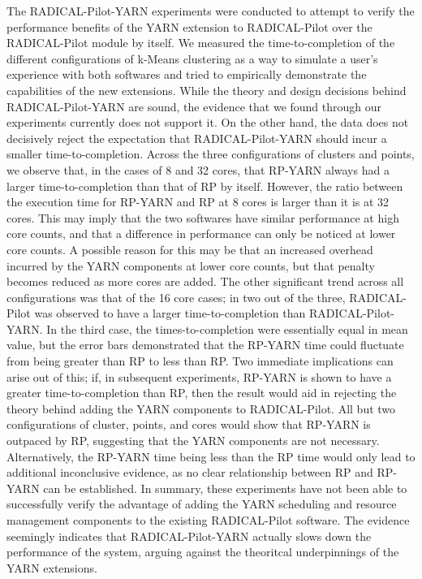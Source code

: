 \documentclass[]{article}
\begin{document}
    The RADICAL-Pilot-YARN experiments were conducted to attempt to verify the performance benefits of the YARN extension to RADICAL-Pilot over the RADICAL-Pilot module by itself. We measured the time-to-completion of the different configurations of k-Means clustering as a way to simulate a user's experience with both softwares and tried to empirically demonstrate the capabilities of the new extensions. While the theory and design decisions behind RADICAL-Pilot-YARN are sound, the evidence that we found through our experiments currently does not support it. On the other hand, the data does not decisively reject the expectation that RADICAL-Pilot-YARN should incur a smaller time-to-completion. Across the three configurations of clusters and points, we observe that, in the cases of 8 and 32 cores, that RP-YARN always had a larger time-to-completion than that of RP by itself. However, the ratio between the execution time for RP-YARN and RP at 8 cores is larger than it is at 32 cores. This may imply that the two softwares have similar performance at high core counts, and that a difference in performance can only be noticed at lower core counts. A possible reason for this may be that an increased overhead incurred by the YARN components at lower core counts, but that penalty becomes reduced as more cores are added. The other significant trend across all configurations was that of the 16 core cases; in two out of the three, RADICAL-Pilot was observed to have a larger time-to-completion than RADICAL-Pilot-YARN. In the third case, the times-to-completion were essentially equal in mean value, but the error bars demonstrated that the RP-YARN time could fluctuate from being greater than RP to less than RP. Two immediate implications can arise out of this; if, in subsequent experiments, RP-YARN is shown to have a greater time-to-completion than RP, then the result would aid in rejecting the theory behind adding the YARN components to RADICAL-Pilot. All but two configurations of cluster, points, and cores would show that RP-YARN is outpaced by RP, suggesting that the YARN components are not necessary. Alternatively, the RP-YARN time being less than the RP time would only lead to additional inconclusive evidence, as no clear relationship between RP and RP-YARN can be established. In summary, these experiments have not been able to successfully verify the advantage of adding the YARN scheduling and resource management components to the existing RADICAL-Pilot software. The evidence seemingly indicates that RADICAL-Pilot-YARN actually slows down the performance of the system, arguing against the theoritcal underpinnings of the YARN extensions.
\end{document}
